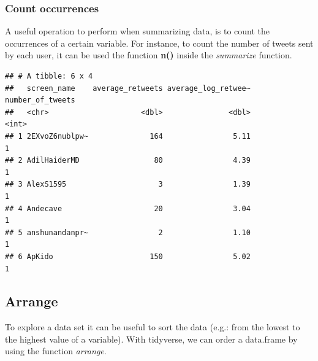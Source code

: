 \documentclass[
]{article}
\newenvironment{Shaded}{\begin{snugshade}}{\end{snugshade}}
\newcommand{\DataTypeTok}[1]{\textcolor[rgb]{0.13,0.29,0.53}{#1}}
\newcommand{\KeywordTok}[1]{\textcolor[rgb]{0.13,0.29,0.53}{\textbf{#1}}}
\newcommand{\NormalTok}[1]{#1}
\newcommand{\OperatorTok}[1]{\textcolor[rgb]{0.81,0.36,0.00}{\textbf{#1}}}
\newcommand{\StringTok}[1]{\textcolor[rgb]{0.31,0.60,0.02}{#1}}
\begin{document}
\hypertarget{count-occurrences}{%
\subsubsection{Count occurrences}\label{count-occurrences}}

A useful operation to perform when summarizing data, is to count the occurrences of a certain variable. For instance, to count the number of tweets sent by each user, it can be used the function \textbf{n()} inside the \emph{summarize} function.

\begin{Shaded}
\end{Shaded}

\begin{verbatim}
## # A tibble: 6 x 4
##   screen_name    average_retweets average_log_retwee~ number_of_tweets
##   <chr>                     <dbl>               <dbl>            <int>
## 1 2EXvoZ6nublpw~              164                5.11                1
## 2 AdilHaiderMD                 80                4.39                1
## 3 AlexS1595                     3                1.39                1
## 4 Andecave                     20                3.04                1
## 5 anshunandanpr~                2                1.10                1
## 6 ApKido                      150                5.02                1
\end{verbatim}

\hypertarget{arrange}{%
\subsection{Arrange}\label{arrange}}

To explore a data set it can be useful to sort the data (e.g.: from the lowest to the highest value of a variable). With tidyverse, we can order a data.frame by using the function \emph{arrange}.
\end{document}
